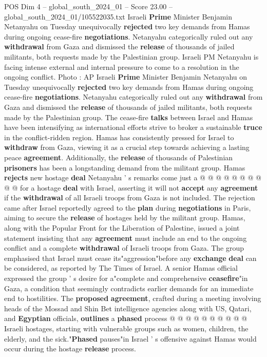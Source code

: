 \begin{textsample}{POS Dim 4 – global\_south\_2024\_01 – Score 23.00 – global\_south\_2024\_01/105522035.txt}  \label{ex:f4_pos_371}
Israeli \textbf{Prime} Minister Benjamin Netanyahu on Tuesday unequivocally \textbf{rejected} two key demands from Hamas during ongoing cease-fire \textbf{negotiations}.
Netanyahu categorically ruled out any \textbf{withdrawal} from Gaza and dismissed the \textbf{release} of thousands of jailed militants, both requests made by the Palestinian group.
Israeli PM Netanyahu is facing intense external and internal pressure to come to a resolution in the ongoing conflict.
Photo : AP Israeli \textbf{Prime} Minister Benjamin Netanyahu on Tuesday unequivocally \textbf{rejected} two key demands from Hamas during ongoing cease-fire \textbf{negotiations}.
Netanyahu categorically ruled out any \textbf{withdrawal} from Gaza and dismissed the \textbf{release} of thousands of jailed militants, both requests made by the Palestinian group.
The cease-fire \textbf{talks} between Israel and Hamas have been intensifying as international efforts strive to broker a sustainable \textbf{truce} in the conflict-ridden region.
Hamas has consistently pressed for Israel to \textbf{withdraw} from Gaza, viewing it as a crucial step towards achieving a lasting peace \textbf{agreement}.
Additionally, the \textbf{release} of thousands of Palestinian \textbf{prisoners} has been a longstanding demand from the militant group.
Hamas \textbf{rejects} new hostage \textbf{deal} Netanyahu ' s remarks come just a @ @ @ @ @ @ @ @ @ @ for a hostage \textbf{deal} with Israel, asserting it will not \textbf{accept} any \textbf{agreement} if the \textbf{withdrawal} of all Israeli troops from Gaza is not included.
The rejection came after Israel reportedly agreed to the \textbf{plan} during \textbf{negotiations} in Paris, aiming to secure the \textbf{release} of hostages held by the militant group.
Hamas, along with the Popular Front for the Liberation of Palestine, issued a joint statement insisting that any \textbf{agreement} must include an end to the ongoing conflict and a complete \textbf{withdrawal} of Israeli troops from Gaza.
The group emphasised that Israel must cease its"aggression"before any \textbf{exchange} \textbf{deal} can be considered, as reported by The Times of Israel.
A senior Hamas official expressed the group ' s desire for a"complete and comprehensive \textbf{ceasefire}"in Gaza, a condition that seemingly contradicts earlier demands for an immediate end to hostilities.
The \textbf{proposed} \textbf{agreement}, crafted during a meeting involving heads of the Mossad and Shin Bet intelligence agencies along with US, Qatari, and \textbf{Egyptian} officials, \textbf{outlines} a \textbf{phased} process @ @ @ @ @ @ @ @ @ @ Israeli hostages, starting with vulnerable groups such as women, children, the elderly, and the sick."\textbf{Phased} pauses"in Israel ' s offensive against Hamas would occur during the hostage \textbf{release} process.

\end{textsample}
